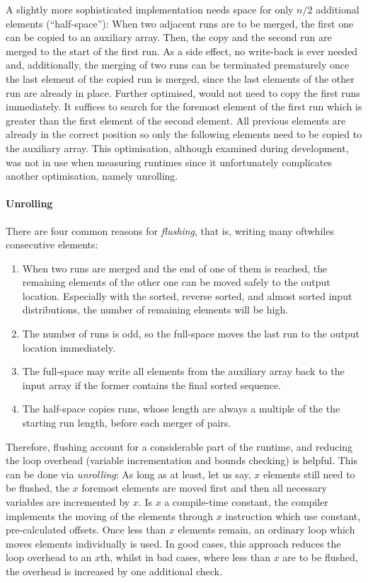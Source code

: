 A slightly more sophisticated implementation needs space for only \(n/2\) additional elements (\enquote{half-space}):
When two adjacent runs are to be merged, the first one can be copied to an auxiliary array.
Then, the copy and the second run are merged to the start of the first run.
As a side effect, no write-back is ever needed and, additionally, the merging of two runs can be terminated prematurely once the last element of the copied run is merged, since the last elements of the other run are already in place.
Further optimised, \MS{} would not need to copy the first runs immediately.
It suffices to search for the foremost element of the first run which is greater than the first element of the second element.
All previous elements are already in the correct position so only the following elements need to be copied to the auxiliary array.
This optimisation, although examined during development, was not in use when measuring runtimes since it unfortunately complicates another optimisation, namely unrolling.

\paragraph{Unrolling}
There are four common reasons for \emph{flushing}, that is, writing \Dash many oftwhiles \Dash consecutive elements:
\begin{enumerate}
	\item
	When two runs are merged and the end of one of them is reached, the remaining elements of the other one can be moved safely to the output location.
	Especially with the sorted, reverse sorted, and almost sorted input distributions, the number of remaining elements will be high.

	\item
	The number of runs is odd, so the full-space \MS{} moves the last run to the output location immediately.

	\item
	The full-space \MS{} may write all elements from the auxiliary array back to the input array if the former contains the final sorted sequence.

	\item
	The half-space \MS{} copies runs, whose length are always a multiple of the the starting run length, before each merger of pairs.
\end{enumerate}
Therefore, flushing account for a considerable part of the runtime, and reducing the loop overhead (variable incrementation and bounds checking) is helpful.
This can be done via \emph{unrolling}:
As long as at least, let us say, \(x\) elements still need to be flushed, the \(x\) foremost elements are moved first and then all necessary variables are incremented by \(x\).
Is \(x\) a compile-time constant, the compiler implements the moving of the elements through \(x\) instruction which use constant, pre-calculated offsets.
Once less than \(x\) elements remain, an ordinary loop which moves elements individually is used.
In good cases, this approach reduces the loop overhead to an \(x\)th, whilst in bad cases, where less than \(x\) are to be flushed, the overhead is increased by one additional check.

